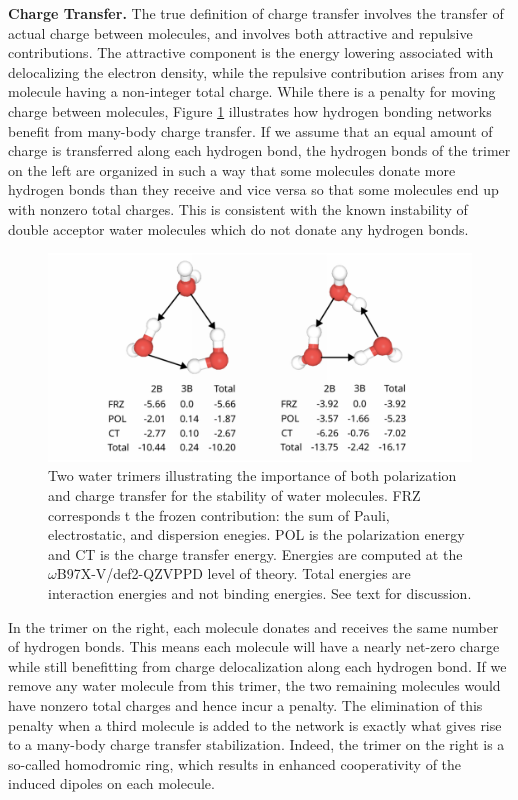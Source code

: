 \documentclass[journal=jctcce,manuscript=article]{achemso}
\begin{document}
\textbf{Charge Transfer.} The true definition of charge transfer involves the transfer of actual charge between molecules\cite{thirman2018characterizing}, and involves both attractive and repulsive contributions. The attractive component is the energy lowering associated with delocalizing the electron density, while the repulsive contribution arises from any molecule having a non-integer total charge. While there is a penalty for moving charge between molecules, Figure \ref{fig:trimer} illustrates how hydrogen bonding networks benefit from many-body charge transfer. If we assume that an equal amount of charge is transferred along each hydrogen bond, the hydrogen bonds of the trimer on the left are organized in such a way that some molecules donate more hydrogen bonds than they receive and vice versa so that some molecules end up with nonzero total charges. This is consistent with the known instability of double acceptor water molecules which do not donate any hydrogen bonds.\cite{kirov2008identifying}
\begin{figure}[H]
  \includegraphics*[width=\textwidth]{figures/trimer_mbe_example.png}
  \caption{Two water trimers illustrating the importance of both polarization
  and charge transfer for the stability of water molecules. FRZ corresponds t
  the frozen contribution: the sum of Pauli, electrostatic, and dispersion enegies. POL is the polarization
  energy and CT is the charge transfer energy. Energies are computed at the
  $\omega$B97X-V/def2-QZVPPD level of theory. Total energies are
  interaction energies and not binding energies. See text for discussion.}
  \label{fig:trimer}
\end{figure}
In the trimer on the right, each molecule donates and receives the same number of hydrogen bonds. This means each molecule will have a nearly net-zero charge while still benefitting from charge delocalization along each hydrogen bond. If we remove any water molecule from this trimer, the two remaining molecules would have nonzero total charges and hence incur a penalty. The elimination of this penalty when a third molecule is added to the network is exactly what gives rise to a many-body charge transfer stabilization.  Indeed, the trimer on the right is a so-called homodromic ring, which results in enhanced cooperativity of the induced dipoles on each molecule.\cite{xantheas2000cooperativity}
\end{document}
